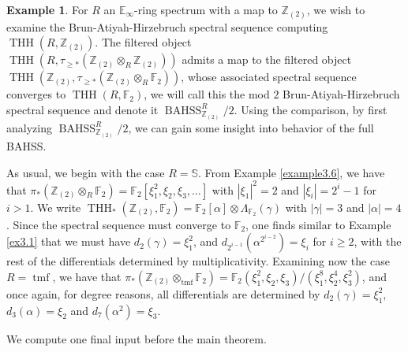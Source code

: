 \documentclass[11pt,leqno]{article}
\newcommand{\zz}{\mathbb{Z}}
\newcommand{\sss}{\mathbb{S}}
\newcommand{\bb}[1]{\mathbb{#1}}
\newcommand{\fff}{\mathbb{F}}
\DeclareMathOperator{\THH}{THH}
\DeclareMathOperator{\tmf}{tmf}
\newcommand{\mo}[1]{\operatorname{#1}}
\newtheorem*{short hand}{theorem name}
\theoremstyle{plain}  %
\theoremstyle{definition}
\newtheorem{example}{Example}[section]
\numberwithin{equation}{section}
\begin{document}
\begin{example}\label{ex3.11} For $R$ an $\bb{E}_{\infty}$-ring spectrum with a map to $\zz_{(2)}$, we wish to examine the Brun-Atiyah-Hirzebruch spectral sequence computing $\THH(R,\zz_{(2)})$.  The filtered object \\$\THH(R,\tau_{\geq *}(\zz_{(2)}\otimes_{R} \zz_{(2)}))$ admits a map to the filtered object $\THH(\zz_{(2)},\tau_{\geq *}(\zz_{(2)}\otimes_{R}\fff_2))$, whose associated spectral sequence converges to $\THH(R,\fff_2)$, we will call this the mod $2$ Brun-Atiyah-Hirzebruch spectral sequence and denote it $\mo{BAHSS}_{\zz_{(2)}}^{R}/2$.  Using the comparison, by first analyzing $\mo{BAHSS}_{\zz_{(2)}}^{R}/2$, we can gain some insight into behavior of the full BAHSS.  

As usual, we begin with the case $R=\sss$.  From Example \ref{example3.6}, we have that $\pi_*(\zz_{(2)}\otimes_{R}\fff_2)=\fff_2[\xi_1^2,\xi_2,\xi_3,\ldots]$ with $|\xi_1|^2=2$ and $|\xi_i|=2^{i}-1$ for $i>1$.  We write $\THH_*(\zz_{(2)},\fff_{2})=\fff_2[\alpha]\otimes \Lambda_{\fff_2}(\gamma)$ with $|\gamma|=3$ and $|\alpha|=4$.  Since the spectral sequence must converge to $\fff_2$, one finds similar to Example \ref{ex3.1} that we must have $d_2(\gamma)=\xi_1^2$, and $d_{2^{i-1}}(\alpha^{2^{i-2}})=\xi_{i}$ for $i\geq 2$, with the rest of the differentials determined by multiplicativity.  Examining now the case $R=\tmf$, we have that $\pi_*(\zz_{(2)}\otimes_{\tmf}\fff_2)=\fff_2(\xi_1^2,\xi_2,\xi_3)/(\xi_1^8,\xi_2^4,\xi_3^2)$, and once again, for degree reasons, all differentials are determined by $d_2(\gamma)=\xi_1^2$, $d_3(\alpha)=\xi_2$ and $d_7(\alpha^2)=\xi_3$.
\end{example}
We compute one final input before the main theorem.
\end{document}
